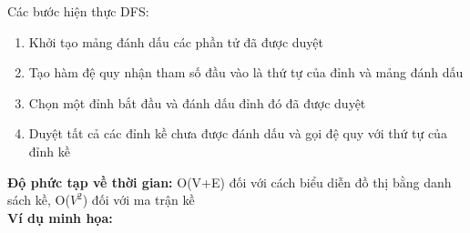 \documentclass[a4paper]{article}
\begin{document}
Các bước hiện thực DFS:
\begin{enumerate}
    \item Khởi tạo mảng đánh dấu các phần tử đã được duyệt
    \item Tạo hàm đệ quy nhận tham số đầu vào là thứ tự của đỉnh và mảng đánh dấu
    \item Chọn một đỉnh bắt đầu và đánh dấu đỉnh đó đã được duyệt
    \item Duyệt tất cả các đỉnh kề chưa được đánh dấu và gọi đệ quy với thứ tự của đỉnh kề
\end{enumerate}
\textbf{Độ phức tạp về thời gian:} O(V+E) đối với cách biểu diễn đồ thị bằng danh sách kề, O($V^2$) đối với ma trận kề \\

\textbf{Ví dụ minh họa:}
        
\end{document}
